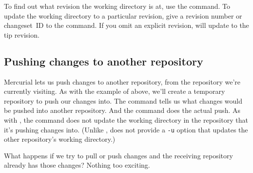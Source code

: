 To find out what revision the working directory is at, use the
 command.
To update the working directory to a particular revision, give a
revision number or changeset~ID to the  command.
If you omit an explicit revision,  will update to the
tip revision.

\subsection{Pushing changes to another repository}

Mercurial lets us push changes to another repository, from the
repository we're currently visiting.  As with the example of
 above, we'll create a temporary repository to push our
changes into.
The  command tells us what changes would be pushed
into another repository.
And the  command does the actual push.
As with , the  command does not update the
working directory in the repository that it's pushing changes into.
(Unlike ,  does not provide a \texttt{-u}
option that updates the other repository's working directory.)

What happens if we try to pull or push changes and the receiving
repository already has those changes?  Nothing too exciting.

